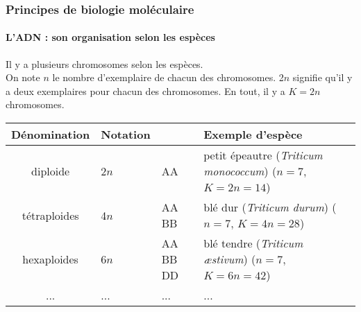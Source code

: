 \begin{frame}
\frametitle{Principes de biologie moléculaire}
\framesubtitle{L'ADN : son organisation selon les espèces}

Il y a plusieurs chromosomes selon les espèces. \\

On note $n$ le nombre d'exemplaire de chacun des chromosomes.
2$n$ signifie qu'il y a deux exemplaires pour chacun des chromosomes. 
En tout, il y a $K=2n$ chromosomes.\\

\vspace{.5cm}

\begin{tabular}{c p{} p{} p{}}
\hline
Dénomination & Notation &  & Exemple d'espèce \\
\hline
diploide & 2$n$ & AA & petit épeautre (\textit{Triticum monococcum}) ($n=7$, $K=2n=14$) \\
tétraploides & 4$n$ & AA BB & blé dur (\textit{Triticum durum}) ($n=7$, $K=4n=28$)\\
hexaploides  & 6$n$ & AA BB DD & blé tendre (\textit{Triticum æstivum}) ($n=7$, $K=6n=42$)\\
... & ... & ... & ... \\
\hline
\end{tabular}

\end{frame}


